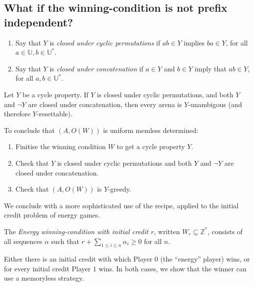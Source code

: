 \documentclass[a4paper,10pt]{article}
\begin{document}
\subsection*{What if the winning-condition is not prefix independent?}

\begin{enumerate}
\item Say that $Y$ is {\em closed under cyclic permutations} if $a b \in Y$ implies
    $ba \in Y$, for all $a \in \mathbb{U}, b \in \mathbb{U}^*$.
\item Say that $Y$ is {\em closed under concatenation} if $a \in Y$ and $b \in Y$
    imply that $ab \in Y$, for all $a,b \in \mathbb{U}^*$.
\end{enumerate}


\begin{theorem} \label{thm: easy}
Let $Y$ be a cycle property. If $Y$ is closed under cyclic permutations, and both $Y$ and $\neg Y$ are closed under concatenation, then every arena is $Y$-unambigous (and therefore $Y$-resettable).
\end{theorem}


\begin{framed}
To conclude that $(A,O(W))$ is uniform memless determined:
\begin{enumerate}

\item Finitise the winning condition $W$ to get a cycle property $Y$.

\item Check that $Y$ is closed under cyclic permutations and both $Y$ and $\neg Y$ are closed under concatenation.

\item Check that $(A,O(W))$ is $Y$-greedy.
\end{enumerate}
\end{framed}

We conclude with a more sophisticated use of the recipe, applied to the initial credit problem of energy games. 

\begin{definition} 
The \emph{Energy winning-condition with initial credit $r$}, written $W_r \subseteq \mathbb{Z}^*$, consists of all sequences $\alpha$ such that $r + \sum_{1 \leq i \leq n} \alpha_i \geq 0$ for all $n$.
\end{definition}

\begin{theorem} 
Either there is an initial credit with which Player $0$ (the ``energy'' player) wins, or for every initial credit Player $1$ wins. In both cases, we show that the winner can use a memoryless strategy. 
\end{theorem}
\end{document}
